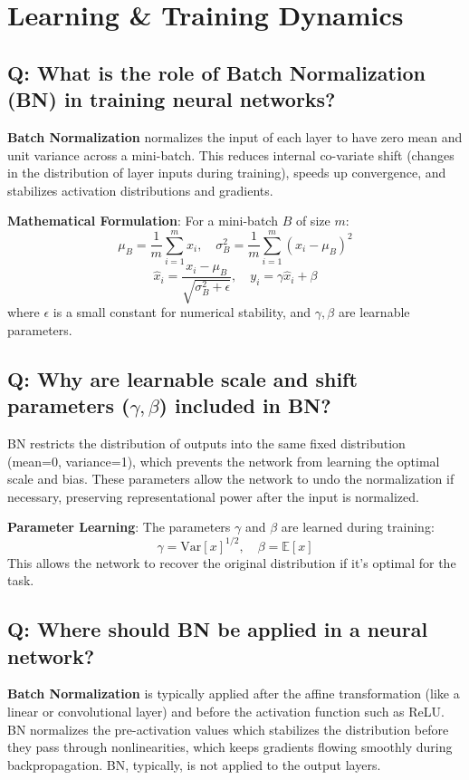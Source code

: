 \section{Learning \& Training Dynamics}

\subsection*{\textcolor{primaryteal}{Q: What is the role of Batch Normalization (BN) in training neural networks?}}
\textbf{Batch Normalization} normalizes the input of each layer to have zero mean and unit variance across a mini-batch. This reduces internal co-variate shift (changes in the distribution of layer inputs during training), speeds up convergence, and stabilizes activation distributions and gradients.

\textbf{Mathematical Formulation}: For a mini-batch $B$ of size $m$:
\[
\mu_B = \frac{1}{m} \sum_{i=1}^{m} x_i, \quad \sigma_B^2 = \frac{1}{m} \sum_{i=1}^{m} (x_i - \mu_B)^2
\]
\[
\hat{x}_i = \frac{x_i - \mu_B}{\sqrt{\sigma_B^2 + \epsilon}}, \quad y_i = \gamma \hat{x}_i + \beta
\]
where $\epsilon$ is a small constant for numerical stability, and $\gamma, \beta$ are learnable parameters.

\subsection*{\textcolor{primaryteal}{Q: Why are learnable scale and shift parameters ($\gamma, \beta$) included in BN?}}
BN restricts the distribution of outputs into the same fixed distribution (mean=0, variance=1), which prevents the network from learning the optimal scale and bias. These parameters allow the network to undo the normalization if necessary, preserving representational power after the input is normalized.

\textbf{Parameter Learning}: The parameters $\gamma$ and $\beta$ are learned during training:
\[
\gamma = \text{Var}[x]^{1/2}, \quad \beta = \mathbb{E}[x]
\]
This allows the network to recover the original distribution if it's optimal for the task.

\subsection*{\textcolor{primaryteal}{Q: Where should BN be applied in a neural network?}}
\textbf{Batch Normalization} is typically applied after the affine transformation (like a linear or convolutional layer) and before the activation function such as ReLU. BN normalizes the pre-activation values which stabilizes the distribution before they pass through nonlinearities, which keeps gradients flowing smoothly during backpropagation. BN, typically, is not applied to the output layers.

